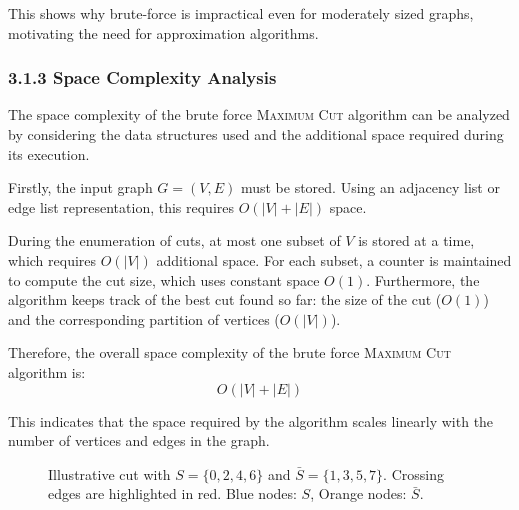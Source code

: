 \documentclass[12pt]{article}
\begin{document}
This shows why brute-force is impractical even for moderately sized graphs, motivating the need for approximation algorithms.

\subsubsection*{3.1.3 Space Complexity Analysis}

The space complexity of the brute force \textsc{Maximum Cut} algorithm can be analyzed by 
considering the data structures used and the additional space required during its execution.

Firstly, the input graph $G = (V,E)$ must be stored. Using an adjacency list or edge list 
representation, this requires $O(|V| + |E|)$ space. 

During the enumeration of cuts, at most one subset of $V$ is stored at a time, which requires 
$O(|V|)$ additional space. For each subset, a counter is maintained to compute the cut size, 
which uses constant space $O(1)$. Furthermore, the algorithm keeps track of the best cut found 
so far: the size of the cut ($O(1)$) and the corresponding partition of vertices ($O(|V|)$). 

Therefore, the overall space complexity of the brute force \textsc{Maximum Cut} algorithm is:
\[
O(|V| + |E|)
\]

This indicates that the space required by the algorithm scales linearly with the number of 
vertices and edges in the graph.

\begin{figure}[H]
    \centering
    \caption{Illustrative cut with $S = \{0,2,4,6\}$ and $\bar{S} = \{1,3,5,7\}$. Crossing edges are highlighted in red. Blue nodes: $S$, Orange nodes: $\bar{S}$.}
    \label{fig:cut-illustration}
\end{figure}
\end{document}
